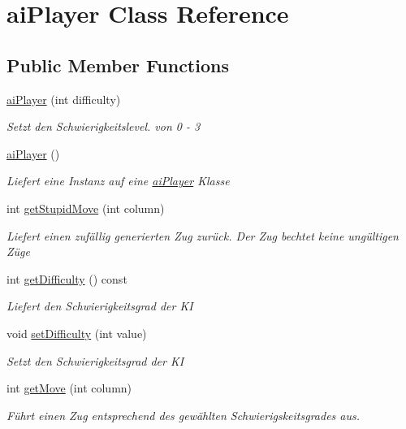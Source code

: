 \hypertarget{classai_player}{\section{ai\-Player Class Reference}
\label{classai_player}
}
\subsection*{Public Member Functions}
\begin{DoxyCompactItemize}
\item 
\hyperlink{classai_player_ae22be237ad50aed3008c1d86378cd82d}{ai\-Player} (int difficulty)
\begin{DoxyCompactList}\small\item\em Setzt den Schwierigkeitslevel. von 0 -\/ 3 \end{DoxyCompactList}\item 
\hyperlink{classai_player_a1218587a379bb61445aa5e67a932e262}{ai\-Player} ()
\begin{DoxyCompactList}\small\item\em Liefert eine Instanz auf eine \hyperlink{classai_player}{ai\-Player} Klasse \end{DoxyCompactList}\item 
int \hyperlink{classai_player_afd94b089fd56bd8ad8e86be6cc2017eb}{get\-Stupid\-Move} (int column)
\begin{DoxyCompactList}\small\item\em Liefert einen zufällig generierten Zug zurück. Der Zug bechtet keine ungültigen Züge \end{DoxyCompactList}\item 
int \hyperlink{classai_player_a431a9ec4ef7a4072ffac7a3ac3816d8a}{get\-Difficulty} () const 
\begin{DoxyCompactList}\small\item\em Liefert den Schwierigkeitsgrad der K\-I \end{DoxyCompactList}\item 
void \hyperlink{classai_player_a3cdaa5c64f3e7f60559ec2973f578197}{set\-Difficulty} (int value)
\begin{DoxyCompactList}\small\item\em Setzt den Schwierigkeitsgrad der K\-I \end{DoxyCompactList}\item 
int \hyperlink{classai_player_a5b30b321986ef6a14d6b39b2e6c488e1}{get\-Move} (int column)
\begin{DoxyCompactList}\small\item\em Führt einen Zug entsprechend des gewählten Schwierigskeitsgrades aus. \end{DoxyCompactList}\end{DoxyCompactItemize}
